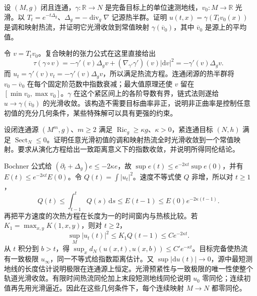 \begin{exercise}\label{g3:ex:harmonic-heat-geodesic-image}
	设 \((M,g)\) 闭且连通，\(\gamma:\mathbb R\to N\) 是完备目标上的单位速测地线，\(v_0:M\to\mathbb R\) 光滑。以 \(T_t=e^{-t\Delta_g}\)、\(\Delta_g=-\operatorname{div}_g\nabla\) 记源热半群。证明 \(u(t,x)=\gamma(T_tv_0(x))\) 是调和映射热流，并证明它光滑收敛到常值映射 \(\gamma(\overline v_0)\)，其中 \(\overline v_0\) 是源上的平均值。
\end{exercise}
\begin{solution}
	令 \(v=T_tv_0\)。复合映射的张力公式在这里直接给出
	\[
		\tau(\gamma\circ v)=-\gamma'(v)\Delta_gv
		+(\nabla_{\gamma'}\gamma')(v)|\mathrm dv|^2
		=-\gamma'(v)\Delta_gv.
	\]
	而 \(u_t=\gamma'(v)v_t=-\gamma'(v)\Delta_gv\)，所以满足热流方程。连通闭源的热半群将 \(v_0-\overline v_0\) 在每个固定阶范数中指数衰减；最大值原理还使 \(v\) 留在 \([\min v_0,\max v_0]\)。\(\gamma\) 在这个紧区间上的各阶导数有界，链式法则遂给 \(u\to\gamma(\overline v_0)\) 的光滑收敛。该构造不需要目标曲率非正，说明非正曲率是控制任意初值的充分几何条件，某些特殊解可以具有更强的约束。
\end{solution}

\begin{exercise}\label{g3:ex:positive-source-heat-constant-limit}
	设闭连通源 \((M^m,g)\)、\(m\ge2\) 满足 \(\operatorname{Ric}_g\ge\kappa g\)、\(\kappa>0\)，紧连通目标 \((N,h)\) 满足 \(\operatorname{Sect}_N\le0\)。证明任意光滑初值的调和映射热流全时光滑收敛到一个常值映射。要求从演化方程给出一致距离意义下的指数收敛，并说明所得同伦结论。
\end{exercise}
\begin{solution}
	Bochner 公式给 \((\partial_t+\Delta_g)e\le-2\kappa e\)，故 \(\sup e(t)\le e^{-2\kappa t}\sup e(0)\)，并有 \(E(t)\le e^{-2\kappa t}E(0)\)。令 \(Q(t)=\int|u_t|^2\)。速度不等式使 \(Q\) 非增，所以对 \(t\ge1\)，
	\[
		Q(t)\le\int_{t-1}^tQ(s)\,\mathrm ds
		\le E(t-1)\le E(0)e^{-2\kappa(t-1)}.
	\]
	再把平方速度的次热方程在长度为一的时间窗内与热核比较。若 \(K_1=\max_{x,y}K(1,x,y)\)，则对 \(t\ge2\)，
	\[
		\sup_M|u_t(t)|^2\le K_1 Q(t-1)\le C e^{-2\kappa t}.
	\]
	从 \(t\) 积分到 \(b>t\)，得 \(\sup_xd_N(u(x,t),u(x,b))\le C'e^{-\kappa t}\)。目标完备使热流有一致极限 \(u_\infty\)，同一不等式给指数距离估计。又 \(\sup|\mathrm du(t)|\to0\)，源中最短测地线的长度估计说明极限在连通源上恒定。光滑预紧性与一致极限的唯一性使整个轨道光滑收敛。有限时间热流同伦加上末段短测地线同伦说明 \(u_0\) 零同伦；连续初值再先用光滑逼近。因此在这些几何条件下，每个连续映射 \(M\to N\) 都零同伦。
\end{solution}


